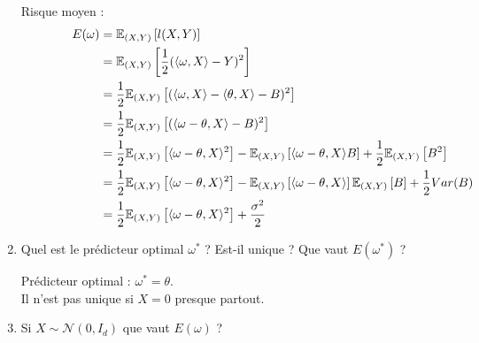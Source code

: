 \documentclass[12pt,a4paper]{article}
\begin{document}
\begin{enumerate}
    \color{blue}
    Risque moyen :
    \begin{align*}
        E(\omega) &= \mathbb{E}_{(X, Y)} \left[l(X, Y)\right] \hspace{14.5cm}\\
        &= \mathbb{E}_{(X, Y)} \left[\frac{1}{2} (\langle \omega, X \rangle - Y)^2\right] \\
        &= \frac{1}{2} \mathbb{E}_{(X, Y)} \left[(\langle \omega, X \rangle - \langle \theta, X \rangle - B)^2\right] \\
        &= \frac{1}{2} \mathbb{E}_{(X, Y)} \left[(\langle \omega - \theta, X \rangle - B)^2\right] \\
        &= \frac{1}{2} \mathbb{E}_{(X, Y)} \left[\langle \omega - \theta, X \rangle ^2 \right]
        - \mathbb{E}_{(X, Y)} \left[\langle \omega - \theta, X \rangle B\right] 
        + \frac{1}{2} \mathbb{E}_{(X, Y)} \left[B^2\right] \\
        &= \frac{1}{2} \mathbb{E}_{(X, Y)} \left[\langle \omega - \theta, X \rangle ^2 \right]
        - \mathbb{E}_{(X, Y)} \left[\langle \omega - \theta, X \rangle \right] \mathbb{E}_{(X, Y)} \left[B\right]
        + \frac{1}{2} Var(B) \\
        &= \frac{1}{2} \mathbb{E}_{(X, Y)} \left[\langle \omega - \theta, X \rangle ^2 \right]
        + \frac{\sigma^2 }{2} \\
    \end{align*}
    

    \color{black}
    \item Quel est le prédicteur optimal $\omega^*$ ?
    Est-il unique ?
    Que vaut $E(\omega^*)$ ?

    \color{blue}
    Prédicteur optimal : $\omega^* = \theta$.\\
    Il n'est pas unique si $X = 0$ presque partout.\\

    \color{black}
    \item Si $X \sim \mathcal{N}(0, I_d)$ que vaut $E(\omega)$ ?
    

\end{enumerate}
\end{document}
